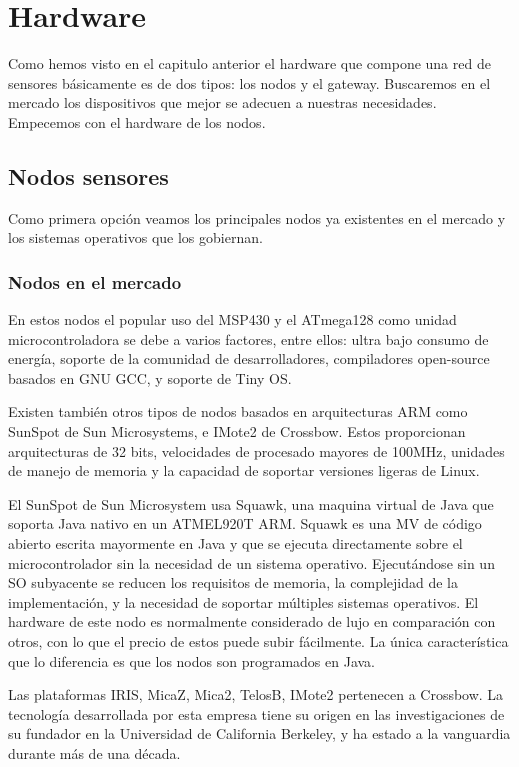 \chapter{Hardware}
Como hemos visto en el capitulo anterior el hardware que compone una red de sensores básicamente es de dos tipos: los nodos y el gateway. Buscaremos en el mercado los dispositivos que mejor se adecuen a nuestras necesidades. Empecemos con el hardware de los nodos.


\section{Nodos sensores}
Como primera opción veamos los principales nodos ya existentes en el mercado y los sistemas operativos que los gobiernan.



\subsection{Nodos en el mercado}
En estos nodos el popular uso del MSP430 y el ATmega128 como unidad microcontroladora se debe a varios factores, entre ellos: ultra bajo consumo de energía, soporte de la comunidad de desarrolladores, compiladores open-source basados en GNU GCC, y soporte de Tiny OS.



Existen también otros tipos de nodos basados en arquitecturas ARM como SunSpot de Sun Microsystems, e IMote2 de Crossbow. Estos proporcionan arquitecturas de 32 bits, velocidades de procesado mayores de 100MHz, unidades de manejo de memoria y la capacidad de soportar versiones ligeras de Linux.



El SunSpot de Sun Microsystem usa Squawk, una maquina virtual de Java que soporta Java nativo en un ATMEL920T ARM. Squawk es una MV de código abierto escrita mayormente en Java y que se ejecuta directamente sobre el microcontrolador sin la necesidad de un sistema operativo. Ejecutándose sin un SO subyacente se reducen los requisitos de memoria, la complejidad de la implementación, y la necesidad de soportar múltiples sistemas operativos. El hardware de este nodo es normalmente considerado de lujo en comparación con otros, con lo que el precio de estos puede subir fácilmente. La única característica que lo diferencia es que los nodos son programados en Java.



Las plataformas IRIS, MicaZ, Mica2, TelosB, IMote2 pertenecen a Crossbow. La tecnología desarrollada por esta empresa tiene su origen en las investigaciones de su fundador en la Universidad de California Berkeley, y ha estado a la vanguardia durante más de una década.



